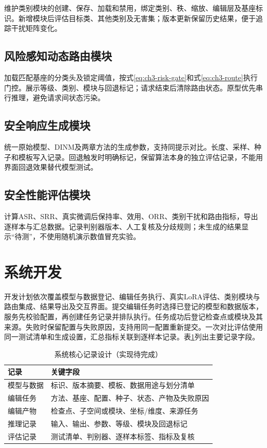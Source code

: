 维护类别模块的创建、保存、加载和禁用，绑定类别、秩、缩放、编辑层及基座标识。新增模块后评估目标类、其他类别及无害集；版本更新保留历史结果，便于追踪干扰矩阵变化。

\subsection{风险感知动态路由模块}

加载匹配基座的分类头及锁定阈值，按式\eqref{eq:ch3-risk-gate}和式\eqref{eq:ch3-route}执行门控。展示等级、类别、模块与回退标记；请求结束后清除路由状态。原型优先串行推理，避免请求间状态污染。

\subsection{安全响应生成模块}

统一原始模型、DINM及两章方法的生成参数，支持同提示对比。长度、采样、种子和模板写入记录。回退触发时明确标记，保留算法本身的独立评估记录，不能用界面回退效果替代模型测试。

\subsection{安全性能评估模块}

计算ASR、SRR、真实微调后保持率、效用、ORR、类别干扰和路由指标，导出逐样本与汇总数据。记录判别器版本、人工复核及分歧规则；未生成的结果显示“待测”，不使用随机演示数值冒充实验。

\section{系统开发}

开发计划依次覆盖模型与数据登记、编辑任务执行、真实LoRA评估、类别模块与路由集成、结果导出及交互界面。提交编辑任务时选择已登记的模型和数据版本，服务先校验配置，再创建任务记录并排队执行。任务成功后登记检查点或模块及其来源。失败时保留配置与失败原因，支持用同一配置重新提交。一次对比评估使用同一测试清单和生成设置，汇总指标关联到逐样本记录。表\ref{tab:system-records}列出主要记录字段。

\begin{table}[htbp]
 \centering
 \caption{系统核心记录设计（实现待完成）}
 \label{tab:system-records}
 \begin{tabular}{p{}p{}}
 \toprule
 记录 & 关键字段\\ \midrule
 模型与数据 & 标识、版本摘要、模板、数据用途与划分清单\\
 编辑任务 & 方法、基座、配置、种子、状态、产物及失败原因\\
 编辑产物 & 检查点、子空间或模块、坐标/维度、来源任务\\
 推理记录 & 输入、输出、参数、等级、模块及回退标记\\
 评估记录 & 测试清单、判别器、逐样本标签、指标及复核\\
 \bottomrule
 \end{tabular}
\end{table}

